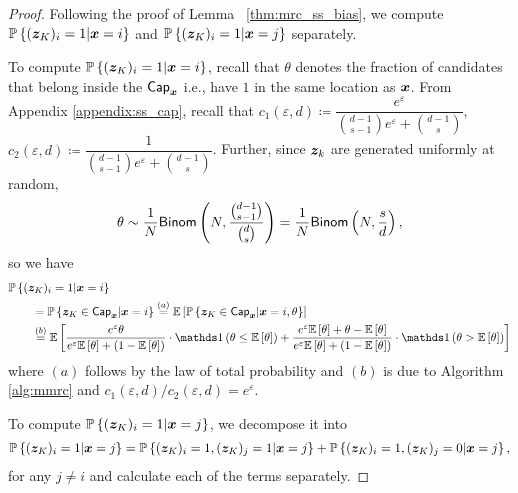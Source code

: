 \begin{proof}
Following the proof of Lemma ~\ref{thm:mrc_ss_bias}, we compute 
$\mathbb{P}\left\{ ({\boldsymbol{z}}_{K})_i = 1 | {\boldsymbol{x}} = i \right\} $ and $\mathbb{P}\left\{ ({\boldsymbol{z}}_{K})_i = 1 | {\boldsymbol{x}} = j  \right\} $ separately.

To compute $\mathbb{P}\left\{ ({\boldsymbol{z}}_K)_i = 1 \middle\vert {\boldsymbol{x}} = i\right\}$, recall that $\theta$ denotes the fraction of candidates that belong inside the $\mathsf{Cap}_{{\boldsymbol{x}}}$ i.e., have $1$ in the same location as ${\boldsymbol{x}}$. From Appendix \ref{appendix:ss_cap}, recall that $c_1(\varepsilon,d) \coloneqq \dfrac{e^\varepsilon}{\binom{d-1}{s-1}e^\varepsilon + \binom{d-1}{s}}$, $c_2(\varepsilon,d) \coloneqq \dfrac{1}{\binom{d-1}{s-1}e^\varepsilon + \binom{d-1}{s}}$. Further, since ${\boldsymbol{z}}_k$ are generated uniformly at random,
$$ \theta \sim \frac{1}{N} \mathsf{Binom}\left( N, \frac{\binom{d-1}{s-1}}{\binom{d}{s}} \right) = \frac{1}{N} \mathsf{Binom}\left( N, \frac{s}{d} \right),$$ so we have
\begin{align}
     & \Pr\lbp (\svbz_K)_i = 1 | \svbx = i \rbp \\
     &\qquad  = \Pr\lbp \svbz_K \in \msf{Cap}_{\svbx} | \svbx = i \rbp  \stackrel{(a)}{=} \E\lb \Pr\lbp \svbz_K  \in \msf{Cap}_{\svbx} |\svbx=i, \theta \rbp\rb \\
    &\qquad \stackrel{(b)}{=} \E\lb \frac{e^\varepsilon \theta}{e^\varepsilon \E\lb \theta \rb + (1-\E \lb \theta \rb)}  \cdot \Indicator \lp \theta \leq \E\lb \theta \rb \rp  + \frac{e^\varepsilon \E \lb \theta \rb + \theta - \E \lb \theta \rb}{e^\varepsilon \E\lb \theta \rb + (1-\E \lb \theta \rb)}  \cdot \Indicator \lp \theta > \E\lb \theta \rb \rp \rb  \label{eq:mmrc_ss_step_1}
\end{align}
where $(a)$ follows by the law of total probability and $(b)$ is due to Algorithm \ref{alg:mmrc} and $c_1(\varepsilon,d)/c_2(\varepsilon,d) = e^\varepsilon$.


To compute $\mathbb{P}\left\{ ({\boldsymbol{z}}_K)_i = 1 \middle\vert {\boldsymbol{x}} = j \right\}$, we decompose it into
\begin{align}
    \mathbb{P}\left\{ ({\boldsymbol{z}}_K)_i = 1 \middle\vert {\boldsymbol{x}} = j \right\} = \mathbb{P}\left\{ ({\boldsymbol{z}}_K)_i = 1, ({\boldsymbol{z}}_K)_j = 1 \middle\vert {\boldsymbol{x}} = j\right\} + \mathbb{P}\left\{ ({\boldsymbol{z}}_K)_i = 1, ({\boldsymbol{z}}_K)_j = 0 \middle\vert {\boldsymbol{x}} = j\right\}, \label{eq:mmrc_Step0}
\end{align}
for any $j \neq i$ and calculate each of the terms separately.


\end{proof}
